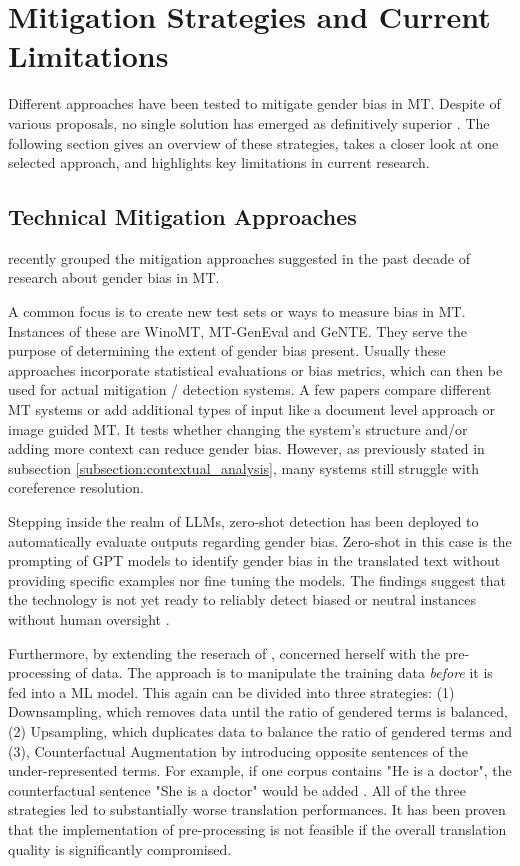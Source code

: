 

\section{Mitigation Strategies and Current Limitations}    

Different approaches have been tested to mitigate gender bias in MT. Despite of various proposals, no single solution has emerged as definitively superior \parencite{savoldiDecadeGenderBias2025}. The following section gives an overview of these strategies, takes a closer look at one selected approach, and highlights key limitations in current research.

\subsection{Technical Mitigation Approaches}
\textcite{savoldiDecadeGenderBias2025} recently grouped the mitigation approaches suggested in the past decade of research about gender bias in MT. 

A common focus is to create new test sets or ways to measure bias in MT. Instances of these are WinoMT, MT-GenEval and GeNTE. They serve the purpose of determining the extent of gender bias present. Usually these approaches incorporate statistical evaluations or bias metrics, which can then be used for actual mitigation / detection systems. A few papers compare different MT systems or add additional types of input like a document level approach or image guided MT. It tests whether changing the system's structure and/or adding more context can reduce gender bias. However, as previously stated in subsection \ref{subsection:contextual_analysis}, many systems still struggle with coreference resolution.

Stepping inside the realm of LLMs, zero-shot detection has been deployed to automatically evaluate outputs regarding gender bias. Zero-shot in this case is the prompting of GPT models to identify gender bias in the translated text without providing specific examples nor fine tuning the models. The findings suggest that the technology is not yet ready to reliably detect biased or neutral instances without human oversight \parencite{lardelliBuildingBridgesDataset2024}. 

Furthermore, by extending the reserach of \textcite{tomalinPracticalEthicsBias2021}, \textcite{ullmannGenderBiasMachine2022} concerned herself with the pre-processing of data. The approach is to manipulate the training data \textit{before} it is fed into a ML model. This again can be divided into three strategies: (1) Downsampling, which removes data until the ratio of gendered terms is balanced, (2) Upsampling, which duplicates data to balance the ratio of gendered terms and (3), Counterfactual Augmentation by introducing opposite sentences of the under-represented terms. For example, if one corpus contains "He is a doctor", the counterfactual sentence "She is a doctor" would be added \parencite{ullmannGenderBiasMachine2022}. All of the three strategies led to substantially worse translation performances. It has been proven that the implementation of pre-processing is not feasible if the overall translation quality is significantly compromised.

